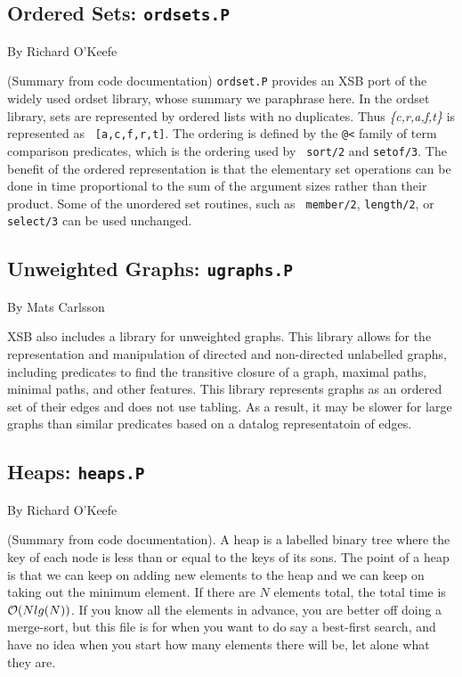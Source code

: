 \subsection{Ordered Sets: {\tt ordsets.P}}
By Richard O'Keefe

%
(Summary from code documentation) {\tt ordset.P} provides an XSB port
  of the widely used ordset library, whose summary we paraphrase here.
  In the ordset library, sets are represented by ordered lists with no
  duplicates.  Thus {\em \{c,r,a,f,t\}} is represented as {\tt
    [a,c,f,r,t]}.  The ordering is defined by the \verb|@<| family of
  term comparison predicates, which is the ordering used by {\tt
    sort/2} and {\tt setof/3}.  The benefit of the ordered
  representation is that the elementary set operations can be done in
  time proportional to the sum of the argument sizes rather than their
  product.  Some of the unordered set routines, such as {\tt
    member/2}, {\tt length/2}, or {\tt select/3} can be used
  unchanged.

\subsection{Unweighted Graphs: {\tt ugraphs.P}}

By Mats Carlsson

%
XSB also includes a library for unweighted graphs.  This library
allows for the representation and manipulation of directed and
non-directed unlabelled graphs, including predicates to find the
transitive closure of a graph, maximal paths, minimal paths, and other
features.  This library represents graphs as an ordered set of their
edges and does not use tabling.  As a result, it may be slower for
large graphs than similar predicates based on a datalog representatoin
of edges.

\subsection{Heaps: {\tt heaps.P}}

By Richard O'Keefe

(Summary from code documentation).  A heap is a labelled binary tree
where the key of each node is less than or equal to the keys of its
sons.  The point of a heap is that we can keep on adding new elements
to the heap and we can keep on taking out the minimum element.  If
there are $N$ elements total, the total time is ${\cal O} (Nlg(N))$.  If
you know all the elements in advance, you are better off doing a
merge-sort, but this file is for when you want to do say a best-first
search, and have no idea when you start how many elements there will
be, let alone what they are.

